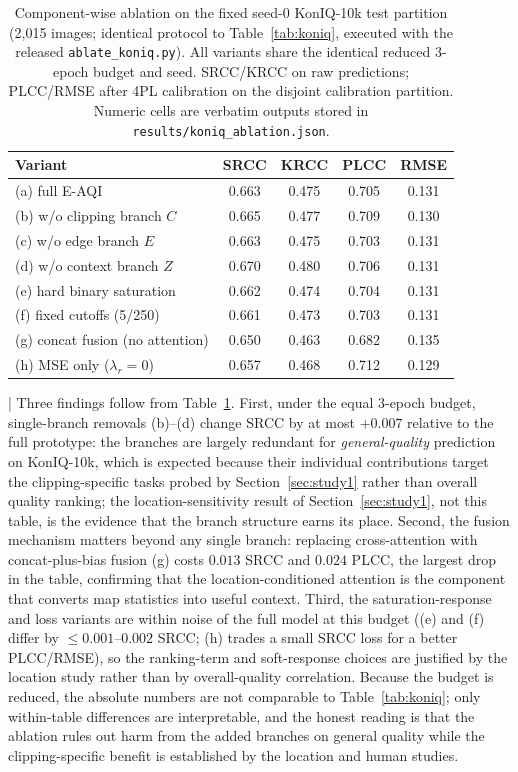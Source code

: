 \documentclass[5p,times,twocolumn]{elsarticle}
\begin{document}
\begin{table}[t]
\centering
\caption{Component-wise ablation on the fixed seed-0 KonIQ-10k test partition
(2{,}015 images; identical protocol to Table~\ref{tab:koniq}, executed with
the released \texttt{ablate\_koniq.py}). All variants share the identical
reduced 3-epoch budget and seed. SRCC/KRCC on raw predictions; PLCC/RMSE
after 4PL calibration on the disjoint calibration partition. Numeric cells
are verbatim outputs stored in \texttt{results/koniq\_ablation.json}.}
\label{tab:ablation}
\footnotesize
\setlength{\tabcolsep}{3pt}
\begin{tabular}{@{}lcccc@{}}
\toprule
Variant & SRCC & KRCC & PLCC & RMSE \\
\midrule
(a) full E-AQI & 0.663 & 0.475 & 0.705 & 0.131 \\
(b) w/o clipping branch $C$ & 0.665 & 0.477 & 0.709 & 0.130 \\
(c) w/o edge branch $E$ & 0.663 & 0.475 & 0.703 & 0.131 \\
(d) w/o context branch $Z$ & 0.670 & 0.480 & 0.706 & 0.131 \\
(e) hard binary saturation & 0.662 & 0.474 & 0.704 & 0.131 \\
(f) fixed cutoffs (5/250) & 0.661 & 0.473 & 0.703 & 0.131 \\
(g) concat fusion (no attention) & 0.650 & 0.463 & 0.682 & 0.135 \\
(h) MSE only ($\lambda_r{=}0$) & 0.657 & 0.468 & 0.712 & 0.129 \\
\bottomrule
\end{tabular}
\end{table}
|
Three findings follow from Table~\ref{tab:ablation}. First, under the equal
3-epoch budget, single-branch removals (b)--(d) change SRCC by at most
$+0.007$ relative to the full prototype: the branches are largely redundant
for \emph{general-quality} prediction on KonIQ-10k, which is expected
because their individual contributions target the clipping-specific tasks
probed by Section~\ref{sec:study1} rather than overall quality ranking; the
location-sensitivity result of Section~\ref{sec:study1}, not this table, is
the evidence that the branch structure earns its place. Second, the fusion
mechanism matters beyond any single branch: replacing cross-attention with
concat-plus-bias fusion (g) costs $0.013$ SRCC and $0.024$ PLCC, the largest
drop in the table, confirming that the location-conditioned attention is
the component that converts map statistics into useful context. Third, the
saturation-response and loss variants are within noise of the full model at
this budget ((e) and (f) differ by $\le 0.001$--$0.002$ SRCC; (h) trades a
small SRCC loss for a better PLCC/RMSE), so the ranking-term and
soft-response choices are justified by the location study rather than by
overall-quality correlation. Because the budget is reduced, the absolute
numbers are not comparable to Table~\ref{tab:koniq}; only within-table
differences are interpretable, and the honest reading is that the ablation
rules out harm from the added branches on general quality while the
clipping-specific benefit is established by the location and human studies.
\end{document}
